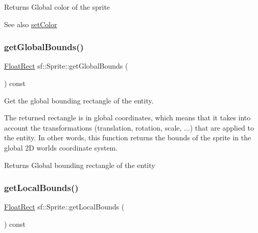 \begin{DoxyReturn}{Returns}
Global color of the sprite
\end{DoxyReturn}
\begin{DoxySeeAlso}{See also}
\hyperlink{classsf_1_1_sprite_a14def44da6437bfea20c4df5e71aba4c}{set\+Color} 
\end{DoxySeeAlso}
\mbox{\label{classsf_1_1_sprite_aa795483096b90745b2e799532963e271}} 
\subsubsection{\texorpdfstring{get\+Global\+Bounds()}{getGlobalBounds()}}
{\footnotesize\ttfamily \hyperlink{classsf_1_1_rect}{Float\+Rect} sf\+::\+Sprite\+::get\+Global\+Bounds (\begin{DoxyParamCaption}{ }\end{DoxyParamCaption}) const}



Get the global bounding rectangle of the entity. 

The returned rectangle is in global coordinates, which means that it takes into account the transformations (translation, rotation, scale, ...) that are applied to the entity. In other words, this function returns the bounds of the sprite in the global 2D world\textquotesingle{}s coordinate system.

\begin{DoxyReturn}{Returns}
Global bounding rectangle of the entity 
\end{DoxyReturn}
\mbox{\label{classsf_1_1_sprite_ab2f4c781464da6f8a52b1df6058a48b8}} 
\subsubsection{\texorpdfstring{get\+Local\+Bounds()}{getLocalBounds()}}
{\footnotesize\ttfamily \hyperlink{classsf_1_1_rect}{Float\+Rect} sf\+::\+Sprite\+::get\+Local\+Bounds (\begin{DoxyParamCaption}{ }\end{DoxyParamCaption}) const}




